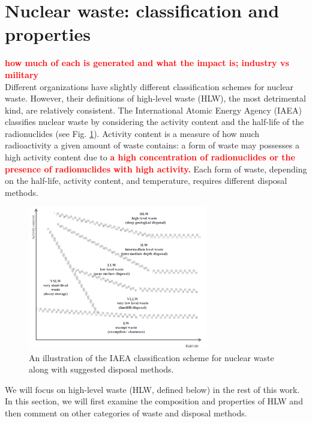 \documentclass[nofootinbib,preprint,aip,pra]{revtex4-1}
\newcommand{\red}[1]{\textcolor{red}{\bf #1}}
\begin{document}
\section{Nuclear waste: classification and properties}
\label{sec:waste}
    \red{how much of each is generated and what the impact is; industry vs military}\\
    Different organizations have slightly different classification schemes for nuclear waste.
    However, their definitions of high-level waste (HLW), the most detrimental kind, are relatively consistent.
    The International Atomic Energy Agency (IAEA) classifies nuclear waste by considering the activity
    content and the half-life of the radionuclides (see Fig. \ref{fig:scheme}).
    Activity content is a measure of how much radioactivity
    a given amount of waste contains: a form of waste may possesses a high activity content due to
    \red{a high concentration of radionuclides or the presence of radionuclides with high activity.}\cite{iaea09}
    Each form of waste, depending on the half-life, activity content, and temperature, requires different
    disposal methods.
    \begin{figure}[h]
        \centering
        \includegraphics[width=0.7\textwidth]{wastescheme.png}
        \caption{An illustration of the IAEA classification scheme for nuclear waste along with suggested
        disposal methods.\cite{iaea09}}
        \label{fig:scheme}
    \end{figure}
    We will focus on high-level waste (HLW, defined below) in the rest of this work.
    In this section, we will first examine the composition and properties of HLW and then
    comment on other categories of waste and disposal methods.
\end{document}
